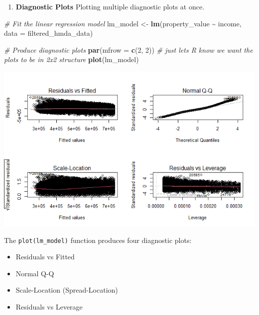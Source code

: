 \documentclass[
]{book}
\newenvironment{Shaded}{\begin{snugshade}}{\end{snugshade}}
\newcommand{\AttributeTok}[1]{\textcolor[rgb]{0.13,0.29,0.53}{#1}}
\newcommand{\CommentTok}[1]{\textcolor[rgb]{0.56,0.35,0.01}{\textit{#1}}}
\newcommand{\DecValTok}[1]{\textcolor[rgb]{0.00,0.00,0.81}{#1}}
\newcommand{\FunctionTok}[1]{\textcolor[rgb]{0.13,0.29,0.53}{\textbf{#1}}}
\newcommand{\NormalTok}[1]{#1}
\newcommand{\OtherTok}[1]{\textcolor[rgb]{0.56,0.35,0.01}{#1}}
\newcommand{\SpecialCharTok}[1]{\textcolor[rgb]{0.81,0.36,0.00}{\textbf{#1}}}
\providecommand{\tightlist}{%
  \setlength{\itemsep}{0pt}\setlength{\parskip}{0pt}}
\begin{document}
\begin{enumerate}
\def\labelenumi{\arabic{enumi}.}
\setcounter{enumi}{1}
\tightlist
\item
  \textbf{Diagnostic Plots} Plotting multiple diagnostic plots at once.
\end{enumerate}

\begin{Shaded}
\begin{Highlighting}[]
\CommentTok{\# Fit the linear regression model}
\NormalTok{lm\_model }\OtherTok{\textless{}{-}} \FunctionTok{lm}\NormalTok{(property\_value }\SpecialCharTok{\textasciitilde{}}\NormalTok{ income, }\AttributeTok{data =}\NormalTok{ filtered\_hmda\_data)}

\CommentTok{\# Produce diagnostic plots}
\FunctionTok{par}\NormalTok{(}\AttributeTok{mfrow =} \FunctionTok{c}\NormalTok{(}\DecValTok{2}\NormalTok{, }\DecValTok{2}\NormalTok{)) }\CommentTok{\# just lets R know we want the plots to be in 2x2 structure}
\FunctionTok{plot}\NormalTok{(lm\_model)}
\end{Highlighting}
\end{Shaded}

\includegraphics{images/diagnostic_plots.PNG}

The \texttt{plot(lm\_model)} function produces four diagnostic plots:

\begin{itemize}
\item
  Residuals vs Fitted
\item
  Normal Q-Q
\item
  Scale-Location (Spread-Location)
\item
  Residuals vs Leverage
\end{itemize}
\end{document}

